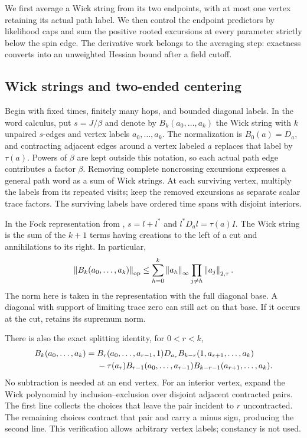 We first average a Wick string from its two endpoints, with at most
one vertex retaining its actual path label. We then control the endpoint
predictors by likelihood caps and sum the positive rooted excursions
at every parameter strictly below the spin edge. The derivative work
belongs to the averaging step: exactness converts
 into an unweighted Hessian bound
after a field cutoff.

\subsection{Wick strings and two-ended centering}
\label{subsec:hidden-wick}

Begin with fixed times, finitely many hops, and bounded diagonal labels.
In the word calculus, put $s=J/\beta$ and denote by
$B_k(a_0,\ldots,a_k)$ the Wick string with $k$ unpaired $s$-edges
and vertex labels $a_0,\ldots,a_k$. The normalization is
$B_0(a)=D_a$, and contracting adjacent edges around a vertex labeled
$a$ replaces that label by $\tau(a)$. Powers of $\beta$ are kept outside
this notation, so each actual path edge contributes a factor $\beta$.
Removing complete noncrossing excursions expresses a general path word
as a sum of Wick strings. At each surviving vertex, multiply the labels
from its repeated visits; keep the removed excursions as separate scalar
trace factors. The surviving labels have ordered time spans with
disjoint interiors.

In the Fock representation from ,
$s=l+l^*$ and $l^*D_al=\tau(a)I$. The Wick string is the sum of the
$k+1$ terms having creations to the left of a cut and annihilations to
its right. In particular,
\begin{equation}\label{eq:hidden-cut-bound}
 \left\lVert B_k(a_0,\ldots,a_k)\right\rVert_{\mathrm{op}}
 \leq\sum_{h=0}^k \left\lVert a_h\right\rVert_{\infty}
                     \prod_{j\ne h}\left\lVert a_j\right\rVert_{2,\tau}.
\end{equation}
The norm here is taken in the representation with the full diagonal
base. A diagonal with support of limiting trace zero can still act on
that base. If it occurs at the cut,  retains
its supremum norm.

There is also the exact splitting identity, for $0<r<k$,
\begin{align}
 B_k(a_0,\ldots,a_k)
 ={}&B_r(a_0,\ldots,a_{r-1},1)D_{a_r}
          B_{k-r}(1,a_{r+1},\ldots,a_k)\notag\\
 &-\tau(a_r)B_{r-1}(a_0,\ldots,a_{r-1})
          B_{k-r-1}(a_{r+1},\ldots,a_k).
 \label{eq:hidden-wick-split}
\end{align}
No subtraction is needed at an end vertex. For an interior vertex,
expand the Wick polynomial by inclusion--exclusion over disjoint
adjacent contracted pairs. The first line collects the choices that
leave the pair incident to $r$ uncontracted. The remaining choices
contract that pair and carry a minus sign, producing the second line.
This verification allows arbitrary vertex labels; constancy is not used.


